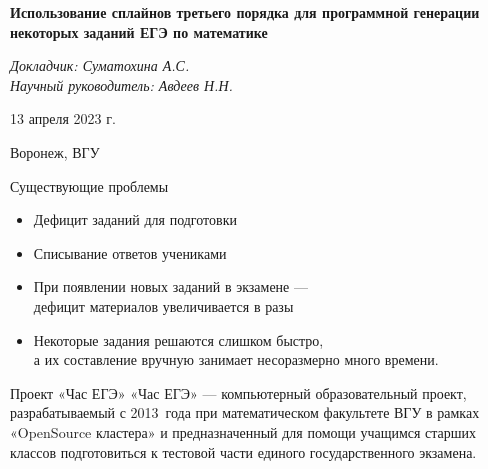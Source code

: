 \documentclass[aspectratio=169,12pt]{beamer}
\begin{document}
\begin{frame}
   \begin{center}
    \vspace{1.5cm}
    \Large\textcolor{NordBrightBlue}{\textbf{Использование сплайнов
    третьего порядка для программной генерации некоторых заданий ЕГЭ по
    математике}}\\
        \end{center}
        \vspace{0.5cm}
        \large\textcolor{NordBlue}{\textit{Докладчик: Суматохина А.С.}}\\
        \large\textcolor{NordBlue}{\textit{Научный руководитель: Авдеев Н.Н.}}\\
        \vspace{0.5cm}
        \begin{center}
            13 апреля 2023 г.
        \end{center}
        \begin{center}
            Воронеж, ВГУ
        \end{center}
        
\end{frame}

\begin{frame}{Существующие проблемы}
    \begin{itemize}
        \item Дефицит заданий для подготовки
        \item Списывание ответов учениками
        \item При появлении новых заданий в экзамене — \\дефицит материалов увеличивается в разы
        \item Некоторые задания решаются слишком быстро, \\а их составление вручную занимает несоразмерно много времени.
    \end{itemize}
\end{frame}

\begin{frame}{Проект «Час ЕГЭ»}
    \large
    «Час ЕГЭ» — компьютерный образовательный проект, разрабатываемый с 2013~года при математическом факультете ВГУ в рамках «OpenSource кластера» и предназначенный для помощи учащимся старших классов подготовиться к тестовой части единого государственного экзамена.
\end{frame}
\end{document}
